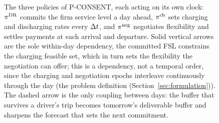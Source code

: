 \begin{figure}[t]
\caption{The three policies of P-CONSENT, each acting on its own clock:
$\pi^{\mathrm{DR}}$ commits the firm service level a day ahead, $\pi^{\mathrm{ch}}$ sets charging and
discharging rates every $\Delta t$, and $\pi^{\mathrm{neg}}$ negotiates flexibility and settles
payments at each arrival and departure. Solid vertical arrows are the sole
within-day dependency, the committed FSL constrains the charging feasible set,
which in turn sets the flexibility the negotiation can offer; this is a
dependency, not a temporal order, since the charging and negotiation epochs
interleave continuously through the day (the problem definition (Section~\ref{sec:formulation})). The dashed
arrow is the only coupling between days: the buffer that survives a driver's
trip becomes tomorrow's deliverable buffer and sharpens the forecast that sets
the next commitment.}
\label{fig:processflow}
\end{figure}
